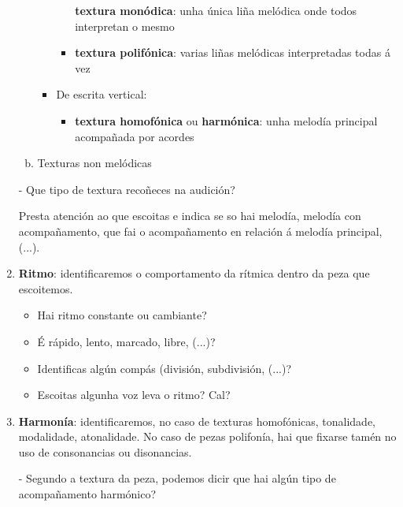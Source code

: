 \begin{enumerate}[1.-]
\begin{enumerate}[a)]
\begin{itemize}
\begin{itemize}
                        \textbf{textura monódica}: unha única liña melódica onde todos interpretan o mesmo
                        \item
                        \textbf{textura polifónica}: varias liñas melódicas interpretadas todas á vez   
                    \end{itemize}
                    \item
                    De escrita vertical: 
                    \begin{itemize}
                        \item 
                        \textbf{textura homofónica} ou \textbf{harmónica}: unha melodía principal acompañada por acordes
                    \end{itemize}
                \end{itemize}
                \item
                Texturas non melódicas
            \end{enumerate}
            \par %
            - Que tipo de textura recoñeces na audición? \dotfill
            \par %
            Presta atención ao que escoitas e indica se so hai melodía, melodía con acompañamento, que fai o acompañamento en relación á melodía principal, (...).
%
        \item %
        \textbf{Ritmo}: identificaremos o comportamento da rítmica dentro da peza que escoitemos.
        \begin{itemize}
            \item 
            Hai ritmo constante ou cambiante? \dotfill
            \item
            É rápido, lento, marcado, libre, (...)? \dotfill
            \item
            Identificas algún compás (división, subdivisión, (...)? \dotfill
            \item
            Escoitas algunha voz leva o ritmo? Cal? \dotfill
        \end{itemize}
%
        \item %
        \textbf{Harmonía}: identificaremos, no caso de texturas homofónicas, tonalidade, modalidade, atonalidade. No caso de pezas polifonía, hai que fixarse tamén no uso de consonancias ou disonancias.
        \par %
        - Segundo a textura da peza, podemos dicir que hai algún tipo de acompañamento harmónico? \dotfill

\end{enumerate}
